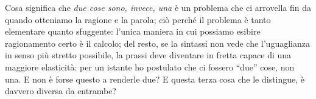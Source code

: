 \documentclass[a4paper, 11pt]{article}
\begin{document}
Cosa significa che \emph{due cose sono, invece, una} è un problema che ci arrovella fin da quando otteniamo la ragione e la parola; ciò perché il problema è tanto elementare quanto sfuggente: l'unica maniera in cui possiamo esibire ragionamento certo è il calcolo; del resto, se la sintassi non vede che l'uguaglianza in senso più stretto possibile, la prassi deve diventare in fretta capace di una maggiore elasticità: per un istante ho postulato che ci fossero ``due'' cose, non una. E non è forse questo a renderle due? E questa terza cosa che le distingue, è davvero diversa da entrambe?
\end{document}
